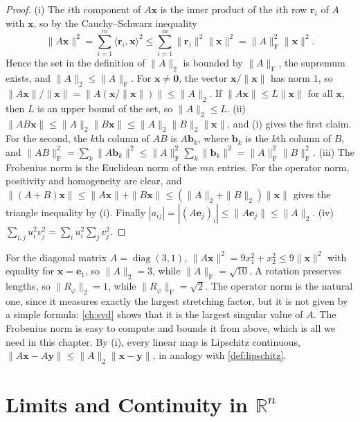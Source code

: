 \begin{proof}
(i) The $i$th component of $A\mathbf x$ is the inner product of the $i$th row $\mathbf r_i$ of $A$ with $\mathbf x$, so by the Cauchy--Schwarz inequality
\[
\|A\mathbf x\|^2=\sum_{i=1}^m\langle\mathbf r_i,\mathbf x\rangle^2\le\sum_{i=1}^m\|\mathbf r_i\|^2\|\mathbf x\|^2=\|A\|_{\mathrm F}^2\|\mathbf x\|^2 .
\]
Hence the set in the definition of $\|A\|_2$ is bounded by $\|A\|_{\mathrm F}$, the supremum exists, and $\|A\|_2\le\|A\|_{\mathrm F}$. For $\mathbf x\ne\mathbf 0$, the vector $\mathbf x/\|\mathbf x\|$ has norm $1$, so $\|A\mathbf x\|/\|\mathbf x\|=\|A(\mathbf x/\|\mathbf x\|)\|\le\|A\|_2$. If $\|A\mathbf x\|\le L\|\mathbf x\|$ for all $\mathbf x$, then $L$ is an upper bound of the set, so $\|A\|_2\le L$. (ii) $\|AB\mathbf x\|\le\|A\|_2\|B\mathbf x\|\le\|A\|_2\|B\|_2\|\mathbf x\|$, and (i) gives the first claim. For the second, the $k$th column of $AB$ is $A\mathbf b_k$, where $\mathbf b_k$ is the $k$th column of $B$, and $\|AB\|_{\mathrm F}^2=\sum_k\|A\mathbf b_k\|^2\le\|A\|_{\mathrm F}^2\sum_k\|\mathbf b_k\|^2=\|A\|_{\mathrm F}^2\|B\|_{\mathrm F}^2$. (iii) The Frobenius norm is the Euclidean norm of the $mn$ entries. For the operator norm, positivity and homogeneity are clear, and $\|(A+B)\mathbf x\|\le\|A\mathbf x\|+\|B\mathbf x\|\le(\|A\|_2+\|B\|_2)\|\mathbf x\|$ gives the triangle inequality by (i). Finally $|a_{ij}|=|(A\mathbf e_j)_i|\le\|A\mathbf e_j\|\le\|A\|_2$. (iv) $\sum_{i,j}u_i^2v_j^2=\sum_iu_i^2\sum_jv_j^2$.
\end{proof}

For the diagonal matrix $A=\operatorname{diag}(3,1)$, $\|A\mathbf x\|^2=9x_1^2+x_2^2\le9\|\mathbf x\|^2$ with equality for $\mathbf x=\mathbf e_1$, so $\|A\|_2=3$, while $\|A\|_{\mathrm F}=\sqrt{10}$. A rotation preserves lengths, so $\|R_\varphi\|_2=1$, while $\|R_\varphi\|_{\mathrm F}=\sqrt2$. The operator norm is the natural one, since it measures exactly the largest stretching factor, but it is not given by a simple formula: \cref{ch:svd} shows that it is the largest singular value of $A$. The Frobenius norm is easy to compute and bounds it from above, which is all we need in this chapter. By (i), every linear map is Lipschitz continuous, $\|A\mathbf x-A\mathbf y\|\le\|A\|_2\|\mathbf x-\mathbf y\|$, in analogy with \cref{def:lipschitz}.

\section{Limits and Continuity in \texorpdfstring{$\mathbb R^n$}{R\^{}n}}
\label{sec:limits-rn}

